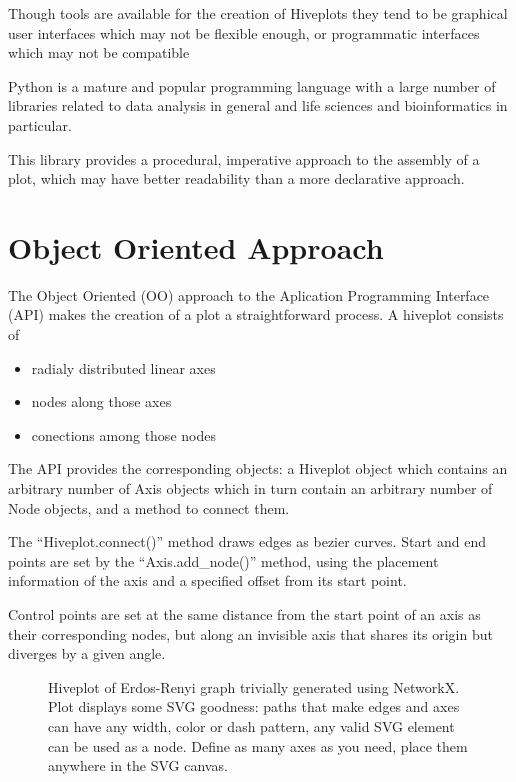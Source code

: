 \documentclass{bioinfo}
\begin{document}
Though tools are available for the creation of Hiveplots they tend to
be graphical user interfaces which may not be flexible enough, or
programmatic interfaces which may not be compatible

Python is a mature and popular programming language with a large
number of libraries related to data analysis in general and life
sciences and bioinformatics in particular.

This library provides a procedural, imperative approach to the
assembly of a plot, which may have better readability than a more
declarative approach.

\section{Object Oriented Approach}

The Object Oriented (OO) approach to the Aplication Programming
Interface (API) makes the creation of a plot a straightforward
process. A hiveplot consists of 
\begin{itemize}
\item radialy distributed linear axes
\item nodes along those axes
\item conections among those nodes
\end{itemize}
The API provides the corresponding objects: a Hiveplot object which
contains an arbitrary number of Axis objects which in turn contain an
arbitrary number of Node objects, and a method to connect them.

The ``Hiveplot.connect()'' method draws edges as bezier curves. Start and
end points are set by the ``Axis.add_node()'' method, using the placement
information of the axis and a specified offset from its start point.

Control points are set at the same distance from the start point of an
axis as their corresponding nodes, but along an invisible axis that
shares its origin but diverges by a given angle.


\begin{figure}[!tpb]%
  \caption{Hiveplot of Erdos-Renyi graph trivially generated using
    NetworkX. Plot displays some SVG goodness: paths that make edges
    and axes can have any width, color or dash pattern, any valid SVG
    element can be used as a node. Define as many axes as you need,
    place them anywhere in the SVG canvas.}\label{fig:01}
\end{figure}
\end{document}
